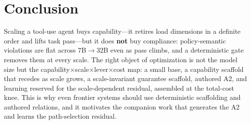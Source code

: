 \section{Conclusion}\label{sec:conclusion}
Scaling a tool-use agent buys capability---it retires load dimensions in a definite order and lifts task pass---but it does \textbf{not} buy compliance: policy-semantic violations are flat across 7B$\to$32B even as pass climbs, and a deterministic gate removes them at every scale. The right object of optimization is not the model size but the capability$\times$scale$\times$lever$\times$cost map: a small base, a capability scaffold that recedes as scale grows, a scale-invariant guarantee scaffold, authored A2, and learning reserved for the scale-dependent residual, assembled at the total-cost knee. This is why even frontier systems should use deterministic scaffolding and authored relations, and it motivates the companion work that generates the A2 and learns the path-selection residual.
